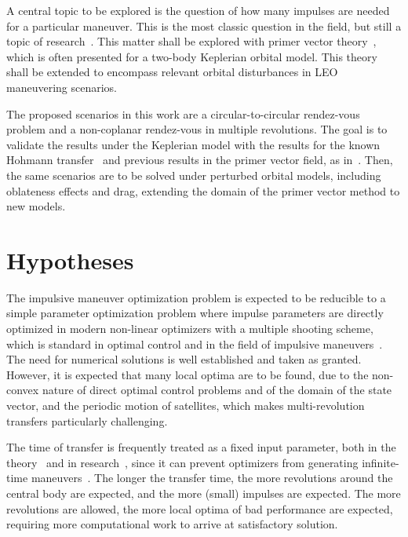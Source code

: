 A central topic to be explored is the question of how many impulses are needed for a particular maneuver. This is the most classic question in the field, but still a topic of research~\cite{how_many_impulses}. This matter shall be explored with primer vector theory~\cite{Conway_2010}, which is often presented for a two-body Keplerian orbital model. This theory shall be extended to encompass relevant orbital disturbances in LEO maneuvering scenarios.

The proposed scenarios in this work are a circular-to-circular rendez-vous problem and a non-coplanar rendez-vous in multiple revolutions. The goal is to validate the results under the Keplerian model with the results for the known Hohmann transfer~\cite{curtis2015orbital} and previous results in the primer vector field, as in~. Then, the same scenarios are to be solved under perturbed orbital models, including oblateness effects and drag, extending the domain of the primer vector method to new models.

\section{Hypotheses}

The impulsive maneuver optimization problem is expected to be reducible to a simple parameter optimization problem where impulse parameters are directly optimized in modern non-linear optimizers with a multiple shooting scheme, which is standard in optimal control and in the field of impulsive maneuvers~\cite{impulsive_europa}. The need for numerical solutions is well established and taken as granted. However, it is expected that many local optima are to be found, due to the non-convex nature of direct optimal control problems and of the domain of the state vector, and the periodic motion of satellites, which makes multi-revolution transfers particularly challenging.

The time of transfer is frequently treated as a fixed input parameter, both in the theory~\cite{Conway_2010} and in research~\cite{fixed_time_primer_vector}, since it can prevent optimizers from generating infinite-time maneuvers~\cite{impulsive_europa}. The longer the transfer time, the more revolutions around the central body are expected, and the more (small) impulses are expected. The more revolutions are allowed, the more local optima of bad performance are expected, requiring more computational work to arrive at satisfactory solution.

